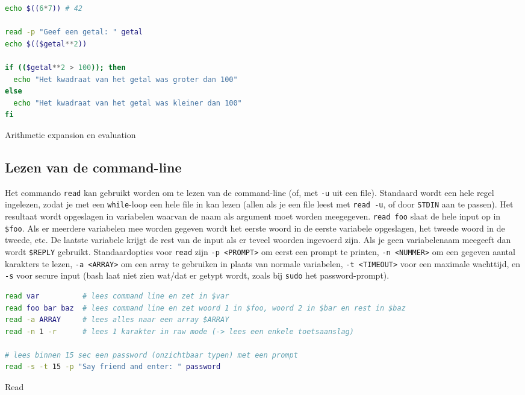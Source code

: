 \begin{listing}
\begin{lstlisting}[language=bash]
echo $((6*7)) # 42

read -p "Geef een getal: " getal
echo $(($getal**2))

if (($getal**2 > 100)); then
  echo "Het kwadraat van het getal was groter dan 100"
else
  echo "Het kwadraat van het getal was kleiner dan 100"
fi
\end{lstlisting}
\caption{Arithmetic expansion en evaluation}
\end{listing}

\subsection{Lezen van de command-line}\label{lezen-van-de-command-line}

Het commando \texttt{read} kan gebruikt worden om te lezen van de command-line (of, met \texttt{-u} uit een file). Standaard wordt een hele regel ingelezen, zodat je met een \texttt{while}-loop een hele file in kan lezen (allen als je een file leest met \texttt{read\ -u}, of door \texttt{STDIN} aan te passen). Het resultaat wordt opgeslagen in variabelen waarvan de naam als argument moet worden meegegeven. \texttt{read\ foo} slaat de hele input op in \texttt{\$foo}. Als er meerdere variabelen mee worden gegeven wordt het eerste woord in de eerste variabele opgeslagen, het tweede woord in de tweede, etc. De laatste variabele krijgt de rest van de input als er teveel woorden ingevoerd zijn. Als je geen variabelenaam meegeeft dan wordt \texttt{\$REPLY} gebruikt. Standaardopties voor \texttt{read} zijn \texttt{-p\ \textless{}PROMPT\textgreater{}} om eerst een prompt te printen, \texttt{-n\ \textless{}NUMMER\textgreater{}} om een gegeven aantal karakters te lezen, \texttt{-a\ \textless{}ARRAY\textgreater{}} om een array te gebruiken in plaats van normale variabelen, \texttt{-t\ \textless{}TIMEOUT\textgreater{}} voor een maximale wachttijd, en \texttt{-s} voor secure input (bash laat niet zien wat/dat er getypt wordt, zoals bij \texttt{sudo} het password-prompt).

\begin{listing}
\begin{lstlisting}[language=bash]
read var          # lees command line en zet in $var
read foo bar baz  # lees command line en zet woord 1 in $foo, woord 2 in $bar en rest in $baz
read -a ARRAY     # lees alles naar een array $ARRAY
read -n 1 -r      # lees 1 karakter in raw mode (-> lees een enkele toetsaanslag)

# lees binnen 15 sec een password (onzichtbaar typen) met een prompt
read -s -t 15 -p "Say friend and enter: " password
\end{lstlisting}
\caption{Read}
\end{listing}

